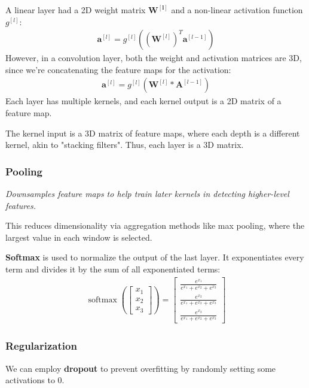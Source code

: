 A linear layer had a 2D weight matrix $\mathbf{W^{[l]}}$ and a non-linear activation function $g^{[l]}$:
\begin{align*}
    \mathbf{a}^{[l]} = g^{[l]} \left(
        (\mathbf{W}^{[l]})^T \mathbf{a}^{[l-1]}
    \right)
\end{align*}
However, in a convolution layer, both the weight and activation matrices are 3D,
since we're concatenating the feature maps for the activation:
\begin{align*}
    \mathbf{a}^{[l]} = g^{[l]} \left(
        \mathbf{W}^{[l]} * \mathbf{A}^{[l-1]}
    \right)
\end{align*}
Each layer has multiple kernels, and each kernel output is a 2D matrix of a feature map.

The kernel input is a 3D matrix of feature maps, where each depth is a different kernel,
akin to "stacking filters".
Thus, each layer is a 3D matrix.

\subsubsection{Pooling}
\emph{Downsamples feature maps to help train later kernels in
detecting higher-level features.}

This reduces dimensionality via aggregation methods
like max pooling, where the largest value in each window is selected.

\textbf{Softmax} is used to normalize the output of the last layer.
It exponentiates every term and divides it by the sum of all exponentiated terms:
\begin{align*}
    \operatorname{softmax}\left(
        \begin{bmatrix*}
            x_1 \\ x_2 \\ x_3
        \end{bmatrix*}
    \right) = \begin{bmatrix*}
        \frac{e^{x_1}}{e^{x_1} + e^{x_2} + e^{x_3}} \\
        \frac{e^{x_2}}{e^{x_1} + e^{x_2} + e^{x_3}} \\
        \frac{e^{x_3}}{e^{x_1} + e^{x_2} + e^{x_3}}
    \end{bmatrix*}
\end{align*}

\subsubsection{Regularization}
We can employ \textbf{dropout} to prevent overfitting by randomly setting
some activations to 0.

